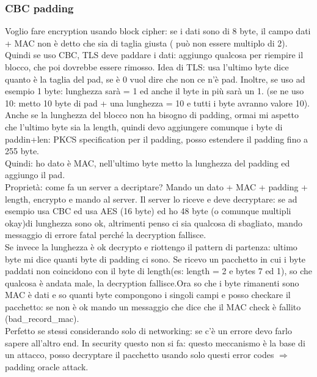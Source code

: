 \documentclass[16px]{article}
\begin{document}
\subsubsection{CBC padding}
Voglio fare encryption usando block cipher: se i dati sono di 8 byte, il campo dati + MAC non è detto che sia di taglia giusta ( può non essere multiplo di 2). Quindi se uso CBC, TLS deve paddare i dati: aggiungo qualcosa per riempire il blocco, che poi dovrebbe essere rimosso. Idea di TLS: usa l'ultimo byte dice quanto è la taglia del pad, se è 0 vuol dire che non ce n'è pad. Inoltre, se uso ad esempio 1 byte: lunghezza sarà = 1 ed anche il byte in più sarà un 1. (se ne uso 10: metto 10 byte di pad + una lunghezza = 10 e tutti i byte avranno valore 10).\\ Anche se la lunghezza del blocco non ha bisogno di padding, ormai mi aspetto che l'ultimo byte sia la length, quindi devo aggiungere comunque i byte di paddin+len: PKCS specification per il padding, posso estendere il padding fino a 255 byte.\\ Quindi: ho dato è MAC, nell'ultimo byte metto la lunghezza del padding ed aggiungo il pad.\\ Proprietà: come fa un server a decriptare? Mando un dato + MAC + padding + length, encrypto e mando al server. Il server lo riceve e deve decryptare: se ad esempio usa CBC ed usa AES (16 byte) ed ho 48 byte (o comunque multipli okay)di lunghezza sono ok, altrimenti penso ci sia qualcosa di sbagliato, mando messaggio di errore fatal perché la decryption fallisce.\\ Se invece la lunghezza è ok decrypto e riottengo il pattern di partenza: ultimo byte mi dice quanti byte di padding ci sono. Se ricevo un pacchetto in cui i byte paddati non coincidono con il byte di length(es: length = 2 e bytes 7 ed 1), so che qualcosa è andata male, la decryption fallisce.Ora so che i byte rimanenti sono MAC è dati e so quanti byte compongono i singoli campi e posso checkare il pacchetto: se non è ok mando un messaggio che dice che il MAC check è fallito (bad\_record\_mac).\\ Perfetto se stessi considerando solo di networking: se c'è un errore devo farlo sapere all'altro end. In security questo non si fa: questo meccanismo è la base di un attacco, posso decryptare il pacchetto usando solo questi error codes $\Rightarrow$ padding oracle attack.
\end{document}
